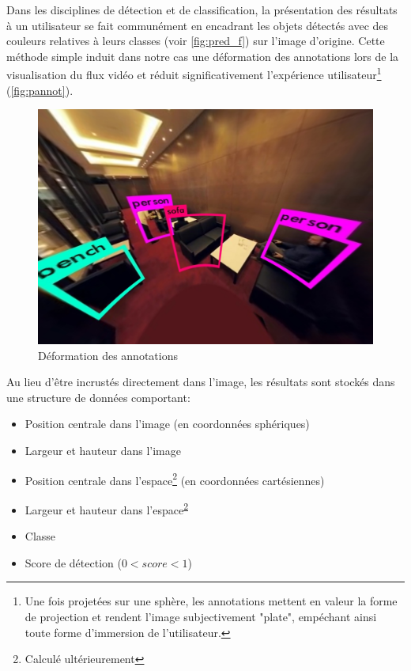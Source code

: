 			\par
			Dans les disciplines de détection et de classification, la présentation des résultats à un utilisateur se fait communément en encadrant les objets détectés avec des couleurs relatives à leurs classes (voir \autoref{fig:pred_f}) sur l'image d'origine. Cette méthode simple induit dans notre cas une déformation des annotations lors de la visualisation du flux vidéo et réduit significativement l'expérience utilisateur\footnote{Une fois projetées sur une sphère, les annotations mettent en valeur la forme de projection et rendent l'image subjectivement "plate", empéchant ainsi toute forme d'immersion de l'utilisateur.} (\autoref{fig:pannot}).
			\begin{figure}[H]
			{
				\centering
				\includegraphics[width=.8\textwidth]{figures/pannot.png}
				\caption{Déformation des annotations}
				\label{fig:pannot}
			}
			\end{figure}
			Au lieu d'être incrustés directement dans l'image, les résultats sont stockés dans une structure de données comportant:
			\begin{itemize}[noitemsep]
				\item Position centrale dans l'image (en coordonnées sphériques)
				\item Largeur et hauteur dans l'image
				\item Position centrale dans l'espace\footnote{\label{ft_calc} Calculé ultérieurement} (en coordonnées cartésiennes)
				\item Largeur et hauteur dans l'espace\textsuperscript{\ref{ft_calc}}
				\item Classe
				\item Score de détection ($ 0 < score < 1 $)
			\end{itemize}
			
